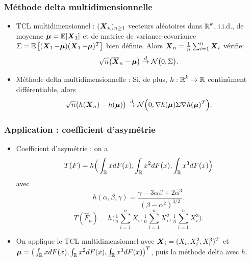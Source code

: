 \begin{frame}
\frametitle{Méthode \og delta\fg{} multidimensionnelle}
\begin{itemize}
\item \alert{TCL multidimensionnel :}
$(\operatorname{\boldsymbol{X}}_n)_{n\ge 1}$ vecteurs aléatoires dans $\operatorname{{\mathbb R}}^k$, i.i.d., de
moyenne ${\boldsymbol \mu} = \operatorname{{\mathbb E}}[\operatorname{\boldsymbol{X}}_1]$ et de matrice de
variance-covariance $\Sigma =
\operatorname{{\mathbb E}}\big[(\operatorname{\boldsymbol{X}}_1-\boldsymbol{\mu})(\operatorname{\boldsymbol{X}}_1-\boldsymbol{\mu})^T\big]$ bien
définie. Alors $\bar {\operatorname{\boldsymbol{X}}}_n=\tfrac{1}{n}\sum_{i = 1}^n\operatorname{\boldsymbol{X}}_i$
v\'erifie:
$$\sqrt{n}\big(\overline{\operatorname{\boldsymbol{X}}}_n-\boldsymbol{\mu}\big) \stackrel{d}{\rightarrow} {\mathcal N}\big(0,\Sigma\big).$$
\item \alert{Méthode \og delta\fg{} multidimensionnelle :} Si, de plus, $h : \operatorname{{\mathbb R}}^k \rightarrow \operatorname{{\mathbb R}}$ continûment différentiable, alors
$$\sqrt{n}\big(h(\overline{\operatorname{\boldsymbol{X}}}_n)-h(\boldsymbol{\mu})\big) \stackrel{d}{\rightarrow} {\mathcal N}\Big(0, \nabla h(\boldsymbol{\mu}) \Sigma \nabla h(\boldsymbol{\mu})^T\Big).$$
\end{itemize}
\end{frame}
\begin{frame}
\frametitle{Application : coefficient d'asymétrie}
\begin{itemize}
\item \alert{Coefficient d'asymétrie :} on a
$$T(F) = h\Big(\int_{\operatorname{{\mathbb R}}} xdF(x),\int_{\operatorname{{\mathbb R}}} x^2 dF(x), \int_{\operatorname{{\mathbb R}}} x^3 dF(x)\Big)$$ avec
$$h(\alpha,\beta,\gamma) = \frac{\gamma-3\alpha \beta+2\alpha^3}{(\beta-\alpha^2)^{3/2}}.$$
$$T(\widehat F_n) = h\Big(\tfrac{1}{n}\sum_{i = 1}^n X_i, \tfrac{1}{n}\sum_{i = 1}^n X_i^2,\tfrac{1}{n}\sum_{i = 1}^n X_i^3\Big).$$
\item On applique le TCL multidimensionnel avec $\operatorname{\boldsymbol{X}}_i = (X_i,X_i^2,X_i^3)^T$ et $\boldsymbol{\mu} = \big(\int_{\operatorname{{\mathbb R}}} xdF(x),\int_{\operatorname{{\mathbb R}}} x^2 dF(x),\int_{\operatorname{{\mathbb R}}} x^3 dF(x)\big)^T$, puis la méthode \og delta\fg{} avec $h$.
\end{itemize}
\end{frame}

